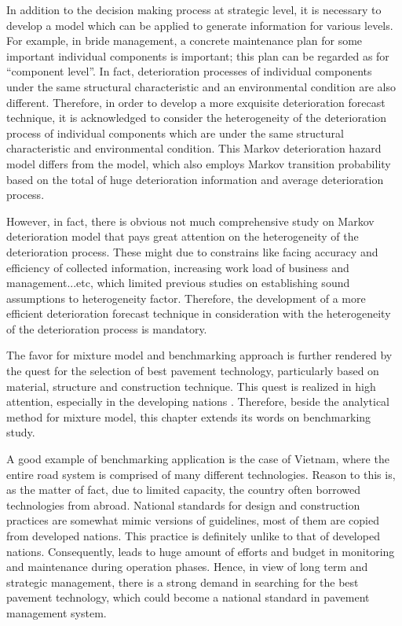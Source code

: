 In addition to the decision making process at strategic level, it is necessary to develop a model which can be applied to generate information for various levels. For example, in bride management, a concrete maintenance plan for some important individual components is important; this plan can be regarded as for ``component level''. In fact, deterioration processes of individual components under the same structural characteristic and an environmental condition are also different. Therefore, in order to develop a more exquisite deterioration forecast technique, it is acknowledged to consider the heterogeneity of the deterioration process of individual components which are under the same structural characteristic and environmental condition. This Markov deterioration hazard model differs from the model, which also employs Markov transition probability based on the total of huge deterioration information and average deterioration process.

However, in fact, there is obvious not much comprehensive study on Markov deterioration model that pays great attention on the heterogeneity of the deterioration process. These might due to constrains like facing accuracy and efficiency of collected information, increasing work load of business and management...etc, which limited previous studies on establishing sound assumptions to heterogeneity factor. Therefore, the development of a more efficient deterioration forecast technique in consideration with the heterogeneity of the deterioration process is mandatory.

The favor for mixture model and benchmarking approach is further rendered by the quest for the selection of best pavement technology, particularly based on material, structure and construction technique. This quest is realized in high attention, especially in the developing nations \cite{kcleong}. Therefore, beside the analytical method for mixture model, this chapter extends its words on benchmarking study. 

A good example of benchmarking application is the case of Vietnam, where the entire road system is comprised of many different technologies. Reason to this is, as the matter of fact, due to limited capacity, the country often borrowed technologies from abroad. National standards for design and construction practices are somewhat mimic versions of guidelines, most of them are copied from developed nations. This practice is definitely unlike to that of developed nations. Consequently, leads to huge amount of efforts and budget in monitoring and maintenance during operation phases. Hence, in view of long term and strategic management, there is a strong demand in searching for the best pavement technology, which could become a national standard in pavement management system. 

